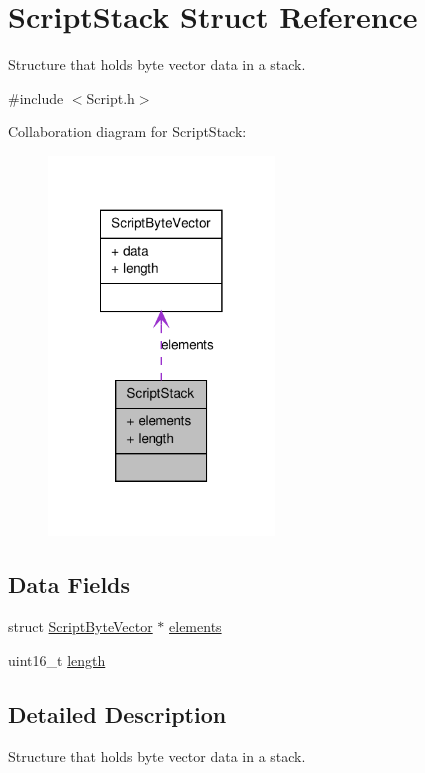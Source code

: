 \hypertarget{struct_script_stack}{
\section{ScriptStack Struct Reference}
\label{struct_script_stack}
}


Structure that holds byte vector data in a stack.  




{\ttfamily \#include $<$Script.h$>$}



Collaboration diagram for ScriptStack:\nopagebreak
\begin{figure}[H]
\begin{center}
\leavevmode
\includegraphics[width=170pt]{struct_script_stack__coll__graph}
\end{center}
\end{figure}
\subsection*{Data Fields}
\begin{DoxyCompactItemize}
\item 
struct \hyperlink{struct_script_byte_vector}{ScriptByteVector} $\ast$ \hyperlink{struct_script_stack_a39919a8f614861eedc5579d2bf18209a}{elements}
\item 
uint16\_\-t \hyperlink{struct_script_stack_a1892eba2086d12ac2b09005aeb09ea3b}{length}
\end{DoxyCompactItemize}


\subsection{Detailed Description}
Structure that holds byte vector data in a stack. 

